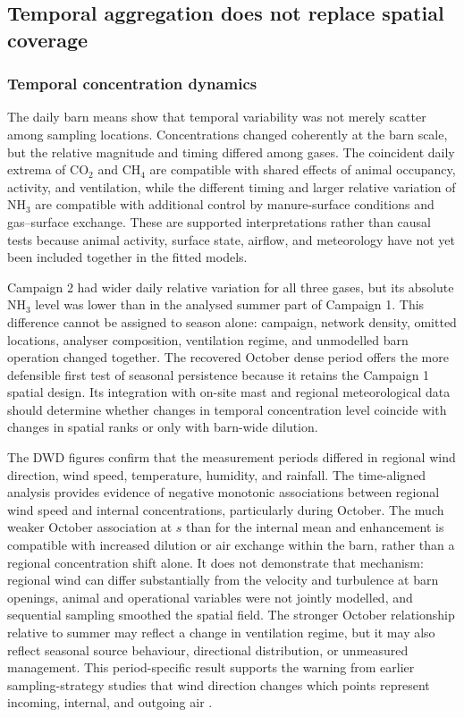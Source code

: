 \documentclass[12pt,a4paper]{article}
\begin{document}
\subsection{Temporal aggregation does not replace spatial coverage}

\subsubsection{Temporal concentration dynamics}

The daily barn means show that temporal variability was not merely scatter
among sampling locations. Concentrations changed coherently at the barn scale,
but the relative magnitude and timing differed among gases. The coincident
daily extrema of \(\mathrm{CO_2}\) and \(\mathrm{CH_4}\) are compatible
with shared effects of animal occupancy, activity, and ventilation, while the
different timing and larger relative variation of \(\mathrm{NH_3}\) are
compatible with additional control by manure-surface conditions and
gas--surface exchange. These are supported interpretations rather than causal
tests because animal activity, surface state, airflow, and meteorology have not
yet been included together in the fitted models.

Campaign 2 had wider daily relative variation for all three gases, but its
absolute \(\mathrm{NH_3}\) level was lower than in the analysed summer part
of Campaign 1. This difference cannot be assigned to season alone: campaign,
network density, omitted locations, analyser composition, ventilation regime,
and unmodelled barn operation changed together. The recovered October dense
period offers the more defensible first test of seasonal persistence because
it retains the Campaign 1 spatial design. Its integration with on-site mast
and regional meteorological data should determine whether changes in temporal
concentration level coincide with changes in spatial ranks or only with
barn-wide dilution.

The DWD figures confirm that the measurement periods differed in regional wind
direction, wind speed, temperature, humidity, and rainfall. The time-aligned
analysis provides evidence of negative monotonic associations between regional
wind speed and internal concentrations, particularly during October. The much
weaker October association at \(s\) than for the internal mean and enhancement
is compatible with increased dilution or air exchange within the barn, rather
than a regional concentration shift alone. It does not demonstrate that
mechanism: regional wind can differ substantially from the velocity and
turbulence at barn openings, animal and operational variables were not jointly
modelled, and sequential sampling smoothed the spatial field. The stronger
October relationship relative to summer may reflect a change in ventilation
regime, but it may also reflect seasonal source behaviour, directional
distribution, or unmeasured management. This period-specific result supports
the warning from earlier sampling-strategy studies that wind direction changes
which points represent incoming, internal, and outgoing air
\citep{Saha2013,Koenig2018,JankeSampling2020}.
\end{document}
